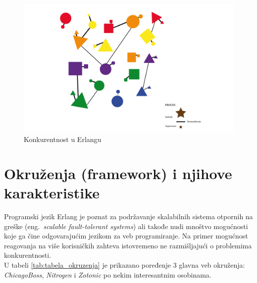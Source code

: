\documentclass[a4paper]{article}
\begin{document}
{\begin{figure}[h!]
\begin{center}
\includegraphics[scale=0.5]{actor_model.png}
\end{center}
\caption{Konkurentnost u Erlangu}
\label{fig:actor_model}
\end{figure}

\section{Okruženja (framework) i njihove karakteristike}
\label{sec:okruzenja}
Programski jezik Erlang je poznat za podržavanje skalabilnih sistema otpornih na greške (eng.~{\em scalable fault-tolerant systems}) ali takođe nudi mnoštvo mogućnosti koje ga čine odgovarajućim jezikom za veb programiranje. Na primer mogućnost reagovanja na više korisničkih zahteva istovremeno ne razmišljajući o problemima konkurentnosti.\\

U tabeli \ref{tab:tabela_okruzenja} je prikazano poređenje 3 glavna veb okruženja: {\em ChicagoBoss}, {\em Nitrogen} i {\em Zotonic} po nekim interesantnim osobinama.

}
\end{document}

